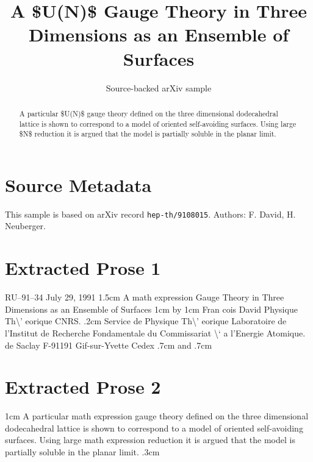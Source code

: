 \documentclass[11pt]{article}
\title{A \$U(N)\$ Gauge Theory in Three Dimensions as an Ensemble of Surfaces}
\author{Source-backed arXiv sample}
\date{}
\begin{document}
\maketitle
\begin{abstract}
A particular \$U(N)\$ gauge theory defined on the three dimensional dodecahedral lattice is shown to correspond to a model of oriented self-avoiding surfaces. Using large \$N\$ reduction it is argued that the model is partially soluble in the planar limit.
\end{abstract}
\section{Source Metadata}
This sample is based on arXiv record \texttt{hep-th/9108015}. Authors: F. David, H. Neuberger.
\section{Extracted Prose 1}
RU--91--34 July 29, 1991 1.5cm A math expression Gauge Theory in Three Dimensions as an Ensemble of Surfaces 1cm by 1cm Fran cois David Physique Th\textbackslash{}' eorique CNRS. .2cm Service de Physique Th\textbackslash{}' eorique Laboratoire de l'Institut de Recherche Fondamentale du Commissariat \textbackslash{}` a l'Energie Atomique. de Saclay F-91191 Gif-sur-Yvette Cedex .7cm and .7cm
\section{Extracted Prose 2}
1cm A particular math expression gauge theory defined on the three dimensional dodecahedral lattice is shown to correspond to a model of oriented self-avoiding surfaces. Using large math expression reduction it is argued that the model is partially soluble in the planar limit. .3cm
\end{document}
